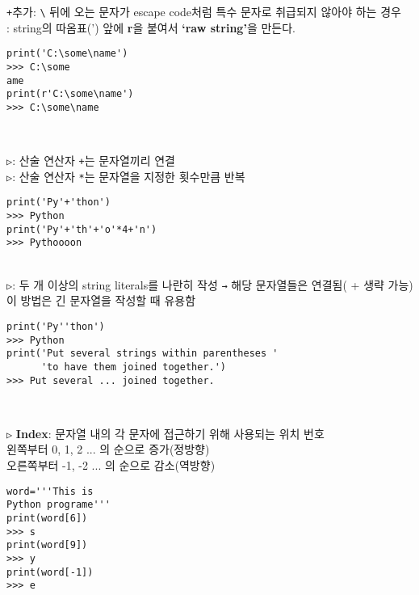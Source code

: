 \documentclass[11pt,a4paper]{article}
\begin{document}
\texttt{+}추가: \verb|\| 뒤에 오는 문자가 escape code처럼 특수 문자로 취급되지 않아야 하는 경우\\
\hspace*{2em}: string의 따옴표(') 앞에 \textbf{r}을 붙여서 \textbf{`raw string'}을 만든다.\\
\begin{lstlisting}[label={list:first},caption=escape code -- raw string]
print('C:\some\name')
>>> C:\some
ame
print(r'C:\some\name')
>>> C:\some\name
\end{lstlisting}\\

\begin{spacing}{1.5}
\texttt{▷}: 산술 연산자 \texttt{+}는 문자열끼리 연결\\
\texttt{▷}: 산술 연산자 \texttt{*}는 문자열을 지정한 횟수만큼 반복
\end{spacing}

\begin{lstlisting}[label={list:first},caption=string literals \texttt{+} Arithmetic Operators]
print('Py'+'thon')
>>> Python
print('Py'+'th'+'o'*4+'n')
>>> Pythoooon
\end{lstlisting}\\

\texttt{▷}: 두 개 이상의 string literals를 나란히 작성 \texttt{→} 해당 문자열들은 연결됨( + 생략 가능)\\
\hspace*{1.5em} 이 방법은 긴 문자열을 작성할 때 유용함
\begin{lstlisting}[label={list:first},caption=long string]
print('Py''thon')
>>> Python
print('Put several strings within parentheses '
      'to have them joined together.')
>>> Put several ... joined together.
\end{lstlisting}\\

\begin{spacing}{1.5}
\texttt{▷} \textbf{Index}: 문자열 내의 각 문자에 접근하기 위해 사용되는 위치 번호\\
\hspace*{5em} 왼쪽부터 0, 1, 2 ... 의 순으로 증가(정방향)\\
\hspace*{5em} 오른쪽부터 -1, -2 ... 의 순으로 감소(역방향)
\end{spacing}
\begin{lstlisting}[label={list:first},caption=Index]
word='''This is
Python programe'''
print(word[6])
>>> s
print(word[9])
>>> y
print(word[-1])
>>> e
\end{lstlisting}\\
\end{document}

